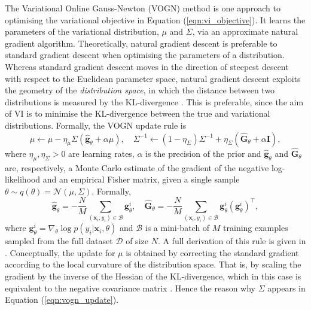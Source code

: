 \documentclass[msc,deptreport.inf]{infthesis} %
\newcommand{\matr}[1]{\mathbf{#1}}
\begin{document}
The Variational Online Gauss-Newton (VOGN) method \cite{tangkaratt2018} is one approach to optimising the variational objective in Equation (\ref{eqn:vi_objective}). It learns the parameters of the variational distribution, $\mu$ and $\Sigma$, via an approximate natural gradient algorithm. Theoretically, natural gradient descent is preferable to standard gradient descent when optimising the parameters of a distribution. Whereas standard gradient descent moves in the direction of steepest descent with respect to the Euclidean parameter space, natural gradient descent exploits the geometry of the \emph{distribution space}, in which the distance between two distributions is measured by the KL-divergence \cite{pascanu2013}. This is preferable, since the aim of VI is to minimise the KL-divergence between the true and variational distributions. Formally, the VOGN update rule is 
\begin{equation}\label{eqn:vogn_update}
	\mu \leftarrow \mu - \eta_\mu \Sigma (\hat{\matr{g}}_\theta + \alpha \mu), \quad 
	\Sigma^{-1} \leftarrow (1 - \eta_\Sigma) \Sigma^{-1} + \eta_\Sigma(\hat{\matr{G}}_\theta + \alpha \matr{I}),
\end{equation}
where $\eta_\mu, \eta_\Sigma > 0$ are learning rates, $\alpha$ is the precision of the prior and $\hat{\matr{g}}_\theta$ and $\hat{\matr{G}}_\theta$ are, respectively, a Monte Carlo estimate of the gradient of the negative log-likelihood and an empirical Fisher matrix, given a single sample $\theta \sim q(\theta) = \mathcal{N}(\mu, \Sigma)$. Formally, 
\begin{equation}\label{eqn:slang_g_and_G}
	\hat{\matr{g}}_\theta = -\frac{N}{M} \sum_{(\matr{x}_i, y_i) \in \mathcal{B}} \matr{g}_\theta^i, \quad
	\hat{\matr{G}}_\theta = -\frac{N}{M} \sum_{(\matr{x}_i, y_i) \in \mathcal{B}} \matr{g}_\theta^i (\matr{g}_\theta^i)^\intercal,
\end{equation}
where $\matr{g}_\theta^i = \nabla_\theta \log p(y_i | \matr{x}_i, \theta)$ and $\mathcal{B}$ is a mini-batch of $M$ training examples sampled from the full dataset $\mathcal{D}$ of size $N$. A full derivation of this rule is given in \cite{tangkaratt2018}. Conceptually, the update for $\mu$ is obtained by correcting the standard gradient according to the local curvature of the distribution space. That is, by scaling the gradient by the inverse of the Hessian of the KL-divergence, which in this case is equivalent to the negative covariance matrix \cite{pascanu2013, opper2009}. Hence the reason why $\Sigma$ appears in Equation (\ref{eqn:vogn_update}).
\end{document}
